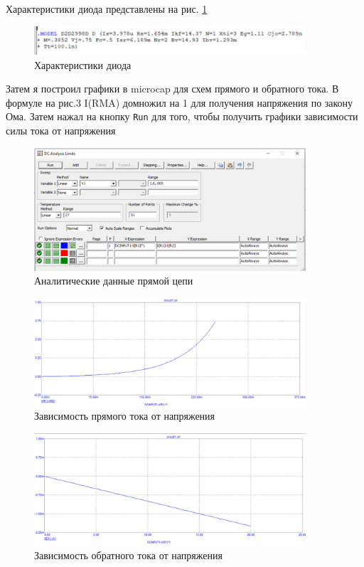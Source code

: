 	\noindent Характеристики диода представлены на рис. \ref{fig:02_main_mcp}
	
	\begin{figure}[ht]
		\centering
		\includegraphics[width=0.9\textwidth]{img/02_main_mcp.jpg}
		\captionsetup{font=footnotesize}
		\caption{Характеристики диода}
		\label{fig:02_main_mcp}
	\end{figure}
	
	
	\noindent Затем я построил графики в microcap для схем прямого и обратного тока. В формуле на рис.3 I(RMA) домножил на 1 для получения напряжения по закону Ома. Затем нажал на кнопку \texttt{Run} для того, чтобы получить графики зависимости силы тока от напряжения
	\begin{figure}[ht]
		\centering
		\includegraphics[width=0.9\textwidth]{img/05_main_mcp.jpg}
		\captionsetup{font=footnotesize}
		\caption{Аналитические данные прямой цепи}
		\label{fig:05_main_mcp}
	\end{figure}
	\begin{figure}[ht]
		\centering
		\includegraphics[width=0.9\textwidth]{img/03_main_mcp.jpg}
		\captionsetup{font=footnotesize}
		\caption{Зависимость прямого тока от напряжения}
		\label{fig:03_main_mcp}
	\end{figure}
	\begin{figure}[ht]
		\centering
		\includegraphics[width=0.9\textwidth]{img/02_back_mcp.jpg}
		\captionsetup{font=footnotesize}
		\caption{Зависимость обратного тока от напряжения}
		\label{fig:02_back_mcp}
	\end{figure}
